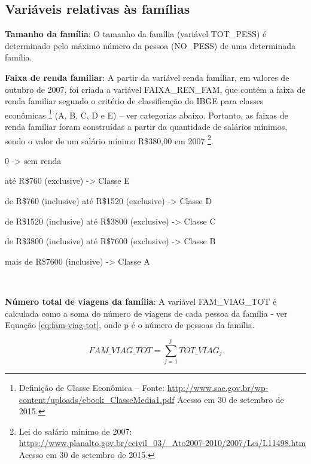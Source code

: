 \subsection{Variáveis relativas às famílias}\label{subsec:novas-var-fam}

\begin{compactitem}

\item \textbf{Tamanho da família}: O tamanho da família (variável TOT_PESS) é determinado pelo máximo número da pessoa (NO_PESS) de uma determinada família.\\

\item \textbf{Faixa de renda familiar}: A partir da variável renda familiar, em valores de outubro de 2007, foi criada a variável FAIXA_REN_FAM, que contém a faixa de renda familiar segundo o critério de classificação do IBGE para classes econômicas
\footnote{Definição de Classe Econômica – Fonte: \url{http://www.sae.gov.br/wp-content/uploads/ebook_ClasseMedia1.pdf} Acesso em 30 de setembro de 2015.} (A, B, C, D e E) – ver categorias abaixo. Portanto, as faixas de renda familiar foram construídas a partir da quantidade de salários mínimos, sendo o valor de um salário mínimo R\$380,00 em 2007
\footnote{Lei do salário mínimo de 2007: \url{ https://www.planalto.gov.br/ccivil_03/_Ato2007-2010/2007/Lei/L11498.htm} Acesso em 30 de setembro de 2015.}.
    \begin{compactitem}[]
    \item 0 -> sem renda
    \item até R\$760 (exclusive) -> Classe E
    \item de R\$760 (inclusive) até R\$1520 (exclusive) -> Classe D
    \item de R\$1520 (inclusive) até R\$3800 (exclusive) -> Classe C
    \item de R\$3800 (inclusive) até R\$7600 (exclusive) -> Classe B
    \item mais de R\$7600 (inclusive) -> Classe A
    \end{compactitem}\

\item \textbf{Número total de viagens da família}: A variável FAM_VIAG_TOT é calculada como a soma do número de viagens de cada pessoa da família - ver Equação \eqref{eq:fam-viag-tot}, onde p é o número de pessoas da família.

\begin{equation}\label{eq:fam-viag-tot}
FAM\_VIAG\_TOT=\displaystyle\sum_{j=1}^{p}TOT\_VIAG_{j}
\end{equation}


\end{compactitem}
